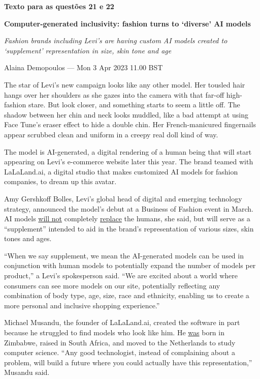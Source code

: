 \textbf{Texto para as questões 21 e 22}\par\medskip
\textbf{Computer-generated inclusivity: fashion turns to `diverse' AI models}\par
\textit{Fashion brands including Levi’s are having custom AI models created to `supplement' representation in size, skin tone and age}\par
Alaina Demopoulos — Mon 3 Apr 2023 11.00 BST\par\medskip
The star of Levi’s new campaign looks like any other model. Her tousled hair hangs over her shoulders as she gazes into the camera with that far-off high-fashion stare. But look closer, and something starts to seem a little off. The shadow between her chin and neck looks muddled, like a bad attempt at using Face Tune’s eraser effect to hide a double chin. Her French-manicured fingernails appear scrubbed clean and uniform in a creepy real doll kind of way.\par
The model is AI-generated, a digital rendering of a human being that will start appearing on Levi’s e-commerce website later this year. The brand teamed with LaLaLand.ai, a digital studio that makes customized AI models for fashion companies, to dream up this avatar.\par
Amy Gershkoff Bolles, Levi’s global head of digital and emerging technology strategy, announced the model’s debut at a Business of Fashion event in March. AI models \underline{will not} completely \underline{replace} the humans, she said, but will serve as a “supplement” intended to aid in the brand’s representation of various sizes, skin tones and ages.\par
“When we say supplement, we mean the AI-generated models can be used in conjunction with human models to potentially expand the number of models per product,” a Levi’s spokesperson said. “We are excited about a world where consumers can see more models on our site, potentially reflecting any combination of body type, age, size, race and ethnicity, enabling us to create a more personal and inclusive shopping experience.”\par
Michael Musandu, the founder of LaLaLand.ai, created the software in part because he struggled to find models who look like him. He \underline{was} born in Zimbabwe, raised in South Africa, and moved to the Netherlands to study computer science. “Any good technologist, instead of complaining about a problem, will build a future where you could actually have this representation,” Musandu said.\par
